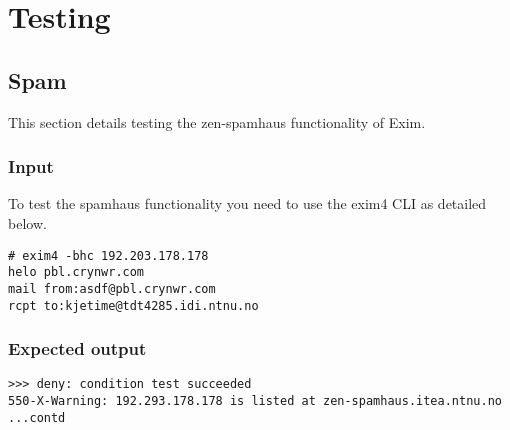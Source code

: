 \section{Testing}
\subsection{Spam}
This section details testing the zen-spamhaus functionality of Exim.
\subsubsection{Input}
To test the spamhaus functionality you need to use the exim4 CLI as detailed below.
\begin{lstlisting}
# exim4 -bhc 192.203.178.178
helo pbl.crynwr.com
mail from:asdf@pbl.crynwr.com
rcpt to:kjetime@tdt4285.idi.ntnu.no
\end{lstlisting}

\subsubsection{Expected output}
\begin{lstlisting}
>>> deny: condition test succeeded
550-X-Warning: 192.293.178.178 is listed at zen-spamhaus.itea.ntnu.no
...contd
\end{lstlisting}
